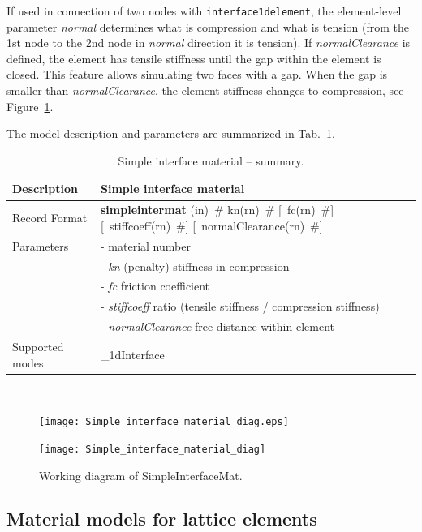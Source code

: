 \documentclass[a4paper]{article}
\newcommand{\descitem}[1]{{\noindent \bf #1}}
\newcommand{\elemparam}[2]{{{#1\tiny (#2)}~\#}}
\newcommand{\optelemparam}[2]{[{~\elemparam{#1}{#2}}]}
\newcommand{\param}[1]{{\it #1}}
\newenvironment{mmt}{\begin{tabular}{|l|p{9cm}|}}{\end{tabular}\\}
\newenvironment{mmt}{\begin{tabular}{|l|l|}}{\end{tabular}\\}
\begin{document}
If used in connection of two nodes with {\tt interface1delement}, the element-level parameter \param{normal} determines what is compression and what is tension (from the 1st node to the 2nd node in \param{normal} direction it is tension). If \param{normalClearance} is defined, the element has tensile stiffness until the gap within the element is closed. This feature allows simulating two faces with a gap. When the gap is smaller than \param{normalClearance}, the element stiffness changes to compression, see Figure~\ref{SimpleInterfaceMat}. 

The model description and parameters are summarized in Tab.~\ref{simpleinterfacemat_table}.

\begin{table}[!htb]
\begin{mmt}
\hline
Description & Simple interface material\\
\hline
Record Format & \descitem{simpleintermat}  \elemparam{}{in}
\elemparam{kn}{rn} \optelemparam{fc}{rn} \optelemparam{stiffcoeff}{rn} \optelemparam{normalClearance}{rn}\\
Parameters &- \param{} material number\\
&- \param{kn} (penalty) stiffness in compression\\
&- \param{fc} friction coefficient\\
&- \param{stiffcoeff} ratio (tensile stiffness / compression stiffness)\\
&- \param{normalClearance} free distance within element\\

Supported modes& \_1dInterface\\
\hline
\end{mmt}
\caption{Simple interface material -- summary.}
\label{simpleinterfacemat_table}
\end{table}

\begin{figure}[!htb]
\begin{htmlonly}
  \centerline{\texttt{[image: Simple\_interface\_material\_diag.eps]}}
\end{htmlonly}
 \centerline{\texttt{[image: Simple\_interface\_material\_diag]}}
  \caption{Working diagram of SimpleInterfaceMat.}
  \label{SimpleInterfaceMat}
\end{figure}

\subsection{Material models for lattice elements}
\end{document}
